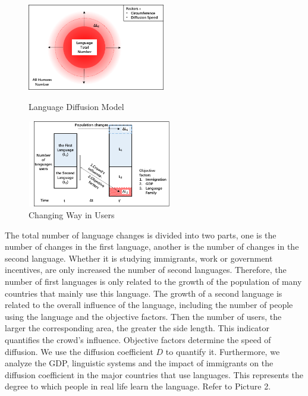\documentclass{mcmthesis}
\begin{document}
    \begin{figure}[h]
      \begin{minipage}[t]{0.5\linewidth}
      \centering
      \includegraphics[height=3.8cm,width=6cm]{p1.png}%
      \caption{Language Diffusion Model}
      \label{p1}
      \end{minipage}
      \begin{minipage}[t]{0.5\linewidth}
      \centering
      \includegraphics[height=3.8cm,width=6.3cm]{p2.png}%
      \caption{Changing Way in Users}
      \label{p2}
      \end{minipage}
    \end{figure}


    The total number of language changes is divided into two parts, one is the number of changes in the first language, another is the number of changes in the second language.
    Whether it is studying immigrants, work or government incentives, are only increased the number of second languages.
    Therefore, the number of first languages is only related to the growth of the population of many countries that mainly use this language.
    The growth of a second language is related to the overall influence of the language, including the number of people using the language and the objective factors.
    Then the number of users, the larger the corresponding area, the greater the side length.
    This indicator quantifies the crowd's influence.
    Objective factors determine the speed of diffusion.
    We use the diffusion coefficient $D$ to quantify it.
    Furthermore, we analyze the GDP, linguistic systems and the impact of immigrants on the diffusion coefficient in the major countries that use languages.
    This represents the degree to which people in real life learn the language.
    Refer to Picture 2.
\end{document}
